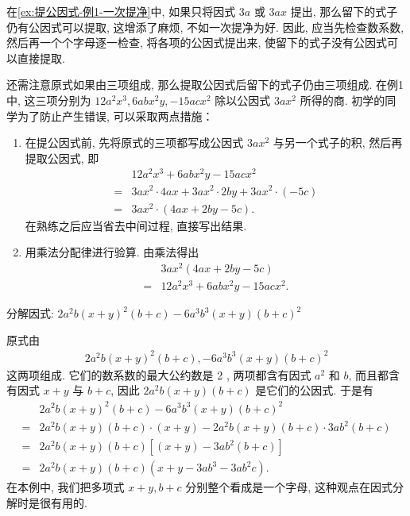 \begin{note}
	在\autoref{ex:提公因式-例1-一次提净}中, 如果只将因式 $3 a$ 或 $3 a x$ 提出, 那么留下的式子仍有公因式可以提取, 这增添了麻烦, 不如一次提净为好. 因此, 应当先检查数系数, 然后再一个个字母逐一检查, 将各项的公因式提出来, 使留下的式子没有公因式可以直接提取.

	还需注意原式如果由三项组成, 那么提取公因式后留下的式子仍由三项组成. 在例1 中, 这三项分别为 $12 a^{2} x^{3} ,  6 a b x^{2} y , -15 a c x^{2}$ 除以公因式 $3 a x^{2}$ 所得的商. 初学的同学为了防止产生错误, 可以采取两点措施：

	\begin{enumerate}
		\item 在提公因式前, 先将原式的三项都写成公因式 $3 a x^{2}$ 与另一个式子的积, 然后再提取公因式, 即
		      \begin{align*}
			        & 12 a^{2} x^{3}+6 a b x^{2} y-15 a c x^{2}                         \\
			      = & 3 a x^{2} \cdot 4 a x+3 a x^{2} \cdot 2 b y+3 a x^{2} \cdot(-5 c) \\
			      = & 3 a x^{2} \cdot(4 a x+2 b y-5 c) .
		      \end{align*}
		      在熟练之后应当省去中间过程, 直接写出结果.
		\item 用乘法分配律进行验算. 由乘法得出
		      \begin{align*}
			        & 3 a x^{2}(4 a x+2 b y-5 c)                  \\
			      = & 12 a^{2} x^{3}+6 a b x^{2} y-15 a c x^{2} .
		      \end{align*}
	\end{enumerate}
\end{note}

\begin{example}[视“多”为一]\label{ex:提公因式-例2-一次提净}
	分解因式: $2 a^{2} b(x+y)^{2}(b+c)-6 a^{3} b^{3}(x+y)(b+c)^{2}$
\end{example}
\begin{solution}
	原式由
	\begin{align*}
		2 a^{2} b(x+y)^{2}(b+c) , -6 a^{3} b^{3}(x+y)(b+c)^{2}
	\end{align*}
	这两项组成. 它们的数系数的最大公约数是 2 , 两项都含有因式 $a^{2}$ 和 $b$, 而且都含有因式 $x+y$ 与 $b+c$, 因此 $2 a^{2} b(x+y)(b+c)$ 是它们的公因式. 于是有
	\begin{align*}
		  & 2 a^{2} b(x+y)^{2}(b+c)-6 a^{3} b^{3}(x+y)(b+c)^{2}                     \\
		= & 2 a^{2} b(x+y)(b+c) \cdot(x+y)-2 a^{2} b(x+y)(b+c) \cdot 3 a b^{2}(b+c) \\
		= & 2 a^{2} b(x+y)(b+c)\left[(x+y)-3 a b^{2}(b+c)\right]                    \\
		= & 2 a^{2} b(x+y)(b+c)\left(x+y-3 a b^{3}-3 a b^{2} c\right) .
	\end{align*}
	在本例中, 我们把多项式 $x+y ,  b+c$ 分别整个看成是一个字母, 这种观点在因式分解时是很有用的.
\end{solution}

